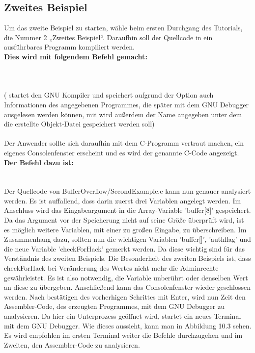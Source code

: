 \subsection{Zweites Beispiel}
Um das zweite Beispiel zu starten, wähle beim ersten Durchgang des Tutorials, die Nummer 2 „Zweites Beispiel“.
Daraufhin soll der Quellcode in ein ausführbares Programm kompiliert werden.\\ \textbf{Dies wird mit folgendem Befehl gemacht:}\\\\
\\\\
( startet den GNU Kompiler und speichert aufgrund der Option  auch Informationen des angegebenen Programmes, die später mit dem GNU Debugger ausgelesen werden können, mit  wird außerdem der Name angegeben unter dem die erstellte Objekt-Datei gespeichert werden soll)\\\\
Der Anwender sollte sich daraufhin mit dem C-Programm vertraut machen, ein eigenes Consolenfenster erscheint und es wird der genannte C-Code angezeigt.\\ \textbf{Der Befehl dazu ist:}\\
\\\\
Der Quellcode von BufferOverflow/SecondExample.c kann nun genauer analysiert werden. Es ist auffallend, dass darin zuerst drei Variablen angelegt werden.
Im Anschluss wird das Eingabeargument in die Array-Variable 'buffer[8]' gespeichert. Da das Argument vor der Speicherung nicht auf seine Größe überprüft wird, ist es möglich weitere Variablen, mit einer zu großen Eingabe, zu überschreiben.
Im Zusammenhang dazu, sollten nun die wichtigen Variablen 'buffer[]', 'authflag' und die neue Variable 'checkForHack' gemerkt werden. Da diese wichtig sind für das Verständnis des zweiten Beispiels. Die Besonderheit des zweiten Beispiels ist, dass checkForHack bei Veränderung des Wertes nicht mehr die Adminrechte gewährleistet. Es ist also notwendig, die Variable unberührt oder denselben Wert an diese zu übergeben. Anschließend kann das Consolenfenster wieder geschlossen werden.
Nach bestätigen des vorherhigen Schrittes mit Enter, wird nun Zeit den Assembler-Code, des erzeugten Programmes, mit dem GNU Debugger zu analysieren. Da hier ein Unterprozess geöffnet wird, startet ein neues Terminal mit dem GNU Debugger. Wie dieses aussieht, kann man in Abbildung 10.3 sehen. Es wird empfohlen im ersten Terminal weiter die Befehle durchzugehen und im Zweiten, den Assembler-Code zu analysieren. 

